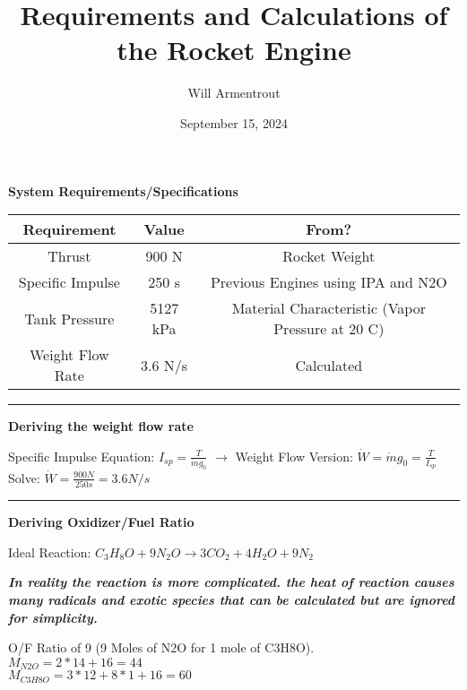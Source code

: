 \documentclass[12pt, letter paper]{article}
\title{Requirements and Calculations of the Rocket Engine}
\author{Will Armentrout}
\date{September 15, 2024}
\begin{document}
	\maketitle
	
	\begin{center}
		\textbf{System Requirements/Specifications}\\
		\begin{tabular}{|c |c |c |}
			\hline
			\textbf{Requirement} & \textbf{Value} & \textbf{From?} \\ \hline
			Thrust & 900 N & Rocket Weight \\ \hline
			Specific Impulse & 250 s & Previous Engines using IPA and N2O \\ \hline
			Tank Pressure & 5127 kPa & Material Characteristic (Vapor Pressure at 20 C) \\ \hline
			Weight Flow Rate & 3.6 N/s & Calculated \\ \hline
			
			
		\end{tabular}
	\end{center}
	\noindent\rule{\linewidth}{0.4pt}
	\begin{center}
		\textbf{Deriving the weight flow rate} \\
	\end{center}
	Specific Impulse Equation:  $I_{sp} = \frac{T}{\dot{m} g_0} $ 
	$\rightarrow$
	Weight Flow Version: $ \dot{W} = \dot{m} g_0= \frac{T}{I_{sp}}$ \\
	Solve: $ \dot{W} = \frac{900 N}{250 s} = 3.6 N/s $
	
	\noindent\rule{\linewidth}{0.4pt}
	\begin{center}
		\textbf{Deriving Oxidizer/Fuel Ratio} \\
	\end{center}
	Ideal Reaction: 
	$ C_3H_8O + 9N_2O \rightarrow 3CO_2 + 4H_2O + 9N_2 $ 
	\begin{center}
	\textbf{\textit{In reality the reaction is more complicated. the heat of reaction causes many radicals and exotic species that can be calculated but are ignored for simplicity.}} 
	\end{center}
	\noindent O/F Ratio of 9 (9 Moles of N2O for 1 mole of C3H8O). \\
	$ M_{N2O} = 2*14 + 16 = 44 $ \\
	$ M_{C3H8O} = 3*12 + 8*1 + 16 =60 $ \\	
	
\end{document}
